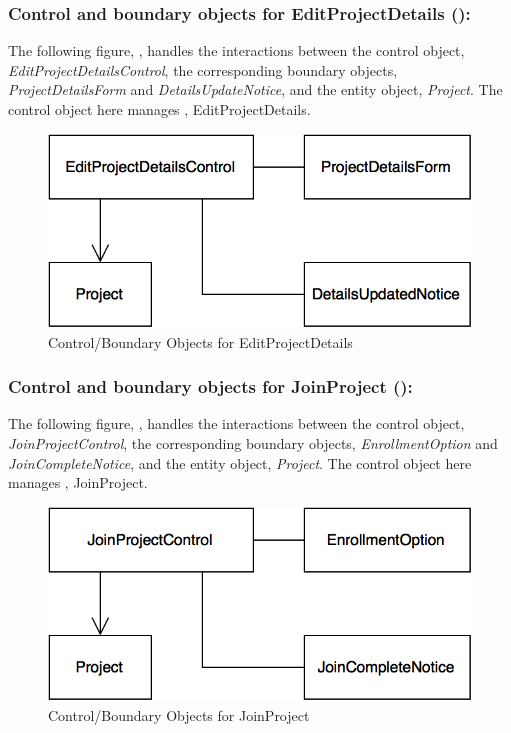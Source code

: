 \documentclass[12pt,letterpaper]{article}
\begin{document}
\subsubsection*{Control and boundary objects for EditProjectDetails ():}

The following figure, , handles the interactions between the control object, {\it EditProjectDetailsControl}, the corresponding boundary objects, {\it ProjectDetailsForm} and {\it DetailsUpdateNotice}, and the entity object, {\it Project}. The control object here manages , EditProjectDetails.

\begin{figure}[H]
	\centering{}
	\includegraphics[scale=0.37]{imgs/cbod/edit-project-details.png}
	\caption{Control/Boundary Objects for EditProjectDetails}
\end{figure}

\subsubsection*{Control and boundary objects for JoinProject ():}

The following figure, , handles the interactions between the control object, {\it JoinProjectControl}, the corresponding boundary objects, 
{\it EnrollmentOption} and {\it JoinCompleteNotice}, and the entity object, {\it Project}. The control object here manages , JoinProject.

\begin{figure}[H]
	\centering{}
	\includegraphics[scale=0.37]{imgs/cbod/join-project.png}
	\caption{Control/Boundary Objects for JoinProject}
\end{figure}
\end{document}
